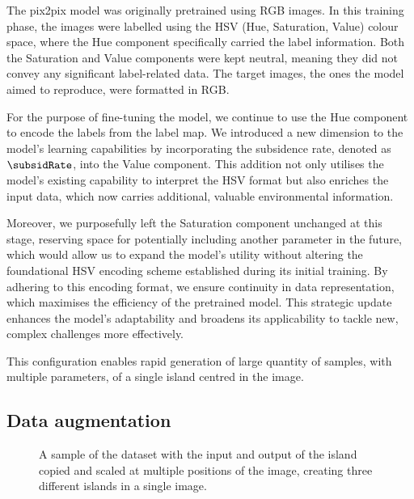 The pix2pix model was originally pretrained using RGB images. In this training phase, the images were labelled using the HSV (Hue, Saturation, Value) colour space, where the Hue component specifically carried the label information. Both the Saturation and Value components were kept neutral, meaning they did not convey any significant label-related data. The target images, the ones the model aimed to reproduce, were formatted in RGB.

For the purpose of fine-tuning the model, we continue to use the Hue component to encode the labels from the label map. We introduced a new dimension to the model's learning capabilities by incorporating the subsidence rate, denoted as $\subsidRate$, into the Value component. This addition not only utilises the model's existing capability to interpret the HSV format but also enriches the input data, which now carries additional, valuable environmental information.

Moreover, we purposefully left the Saturation component unchanged at this stage, reserving space for potentially including another parameter in the future, which would allow us to expand the model's utility without altering the foundational HSV encoding scheme established during its initial training. By adhering to this encoding format, we ensure continuity in data representation, which maximises the efficiency of the pretrained model. This strategic update enhances the model's adaptability and broadens its applicability to tackle new, complex challenges more effectively.

This configuration enables rapid generation of large quantity of samples, with multiple parameters, of a single island centred in the image.

\subsection{Data augmentation}
\label{sec:coral-island-data-augmentation}

\begin{figure}[H]
    \caption[A sample of the dataset with multiple transformations]{A sample of the dataset with the input and output of the island copied and scaled at multiple positions of the image, creating three different islands in a single image.}
    \label{fig:coral-island-cGAN-examples}
\end{figure}

